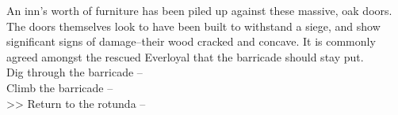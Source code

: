 An inn’s worth of furniture has been piled up against these massive, oak doors. The doors themselves look to have been built to withstand a siege, and show significant signs of damage--their wood cracked and concave. It is commonly agreed amongst the rescued Everloyal that the barricade should stay put.\\

 Dig through the barricade -- \\
 Climb the barricade -- \\
>> Return to the rotunda -- 